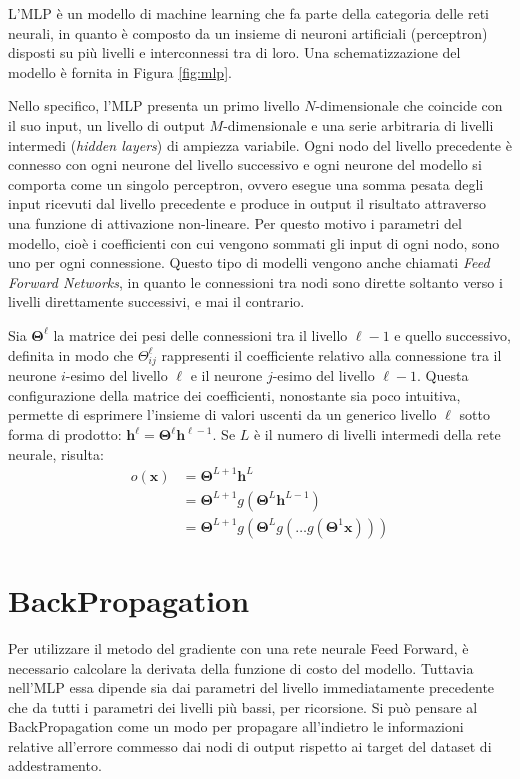 \documentclass{standalone}
\begin{document}
L'MLP è un modello di machine learning che fa parte della categoria delle reti
neurali, in quanto è composto da un insieme di neuroni artificiali
(perceptron) disposti su più livelli e interconnessi tra di loro. Una
schematizzazione del modello è fornita in Figura \ref{fig:mlp}.

Nello specifico, l'MLP presenta un primo livello $N$-dimensionale che coincide con il
suo input, un livello di output $M$-dimensionale e una serie arbitraria di
livelli intermedi (\emph{hidden layers}) di ampiezza variabile. Ogni nodo del
livello precedente è connesso con ogni neurone del livello successivo e ogni
neurone del modello si comporta come un singolo perceptron, ovvero esegue una
somma pesata degli input ricevuti dal livello precedente e produce in output il
risultato attraverso una funzione di attivazione non-lineare. Per questo motivo
i parametri del modello, cioè i coefficienti con cui vengono sommati gli input
di ogni nodo, sono uno per ogni connessione. Questo tipo di modelli vengono
anche chiamati \emph{Feed Forward Networks}, in quanto le connessioni tra nodi
sono dirette soltanto verso i livelli direttamente successivi, e mai il
contrario.

Sia $\bm \Theta^\ell$ la matrice dei pesi delle connessioni tra il livello
$\ell-1$ e quello successivo, definita in modo che $ \Theta^\ell_{ij} $
rappresenti il coefficiente relativo alla connessione tra il neurone $i$-esimo
del livello $\ell$ e il neurone $j$-esimo del livello $\ell-1$. Questa
configurazione della matrice dei coefficienti, nonostante sia poco intuitiva,
permette di esprimere l'insieme di valori uscenti da un generico livello $\ell$
sotto forma di prodotto: $ \bm h^\ell = \bm \Theta^\ell \bm h^{\ell-1}$. Se
$L$ è il numero di livelli intermedi della rete neurale, risulta:
\begin{align*}
o(\bm x) &= \bm \Theta^{L+1} \bm h^L \\
         &= \bm \Theta^{L+1} g( \bm \Theta^L \bm h^{L-1}) \\
         &= \bm \Theta^{L+1} g(\bm \Theta^L g(\dots g(\bm \Theta^1 \bm x)))
\end{align*}
\section{BackPropagation}
Per utilizzare il metodo del gradiente con una rete neurale Feed Forward, è
necessario calcolare la derivata della funzione di costo del modello. Tuttavia
nell'MLP essa dipende sia dai parametri del livello immediatamente precedente
che da tutti i parametri dei livelli più bassi, per ricorsione. Si può pensare
al BackPropagation come un modo per propagare all'indietro le informazioni
relative all'errore commesso dai nodi di output rispetto ai target del dataset
di addestramento.
\end{document}
